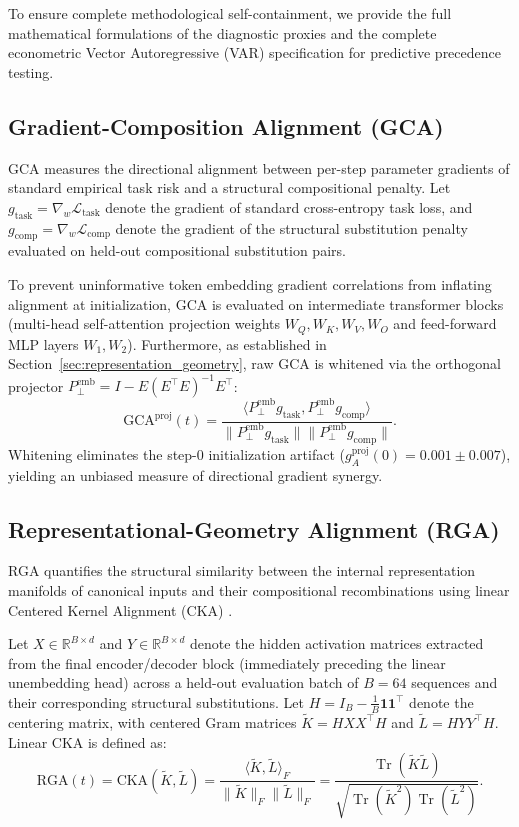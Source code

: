 \documentclass{article}
\theoremstyle{plain}
\theoremstyle{definition}
\DeclareMathOperator{\Tr}{Tr}
\begin{document}
To ensure complete methodological self-containment, we provide the full mathematical formulations of the diagnostic proxies and the complete econometric Vector Autoregressive (VAR) specification for predictive precedence testing.
\subsection{Gradient-Composition Alignment (GCA)}
GCA measures the directional alignment between per-step parameter gradients of standard empirical task risk and a structural compositional penalty. Let $g_{\text{task}} = \nabla_w \mathcal{L}_{\text{task}}$ denote the gradient of standard cross-entropy task loss, and $g_{\text{comp}} = \nabla_w \mathcal{L}_{\text{comp}}$ denote the gradient of the structural substitution penalty evaluated on held-out compositional substitution pairs.

To prevent uninformative token embedding gradient correlations from inflating alignment at initialization, GCA is evaluated on intermediate transformer blocks (multi-head self-attention projection weights $W_Q, W_K, W_V, W_O$ and feed-forward MLP layers $W_1, W_2$). Furthermore, as established in Section~\ref{sec:representation_geometry}, raw GCA is whitened via the orthogonal projector $P_{\perp}^{\text{emb}} = I - E (E^\top E)^{-1} E^\top$:
\begin{equation}
    \text{GCA}^{\text{proj}}(t) = \frac{\langle P_{\perp}^{\text{emb}} g_{\text{task}}, P_{\perp}^{\text{emb}} g_{\text{comp}} \rangle}{\| P_{\perp}^{\text{emb}} g_{\text{task}} \| \| P_{\perp}^{\text{emb}} g_{\text{comp}} \|}.
    \label{eq:app_whitened_gca}
\end{equation}
Whitening eliminates the step-0 initialization artifact ($g_A^{\text{proj}}(0) = 0.001 \pm 0.007$), yielding an unbiased measure of directional gradient synergy.

\subsection{Representational-Geometry Alignment (RGA)}
RGA quantifies the structural similarity between the internal representation manifolds of canonical inputs and their compositional recombinations using linear Centered Kernel Alignment (CKA) \citep{Kornblith2019Similarity}.

Let $X \in \mathbb{R}^{B \times d}$ and $Y \in \mathbb{R}^{B \times d}$ denote the hidden activation matrices extracted from the final encoder/decoder block (immediately preceding the linear unembedding head) across a held-out evaluation batch of $B=64$ sequences and their corresponding structural substitutions. Let $H = I_B - \frac{1}{B}\mathbf{1}\mathbf{1}^\top$ denote the centering matrix, with centered Gram matrices $\tilde{K} = H X X^\top H$ and $\tilde{L} = H Y Y^\top H$. Linear CKA is defined as:
\begin{equation}
    \text{RGA}(t) = \text{CKA}(\tilde{K}, \tilde{L}) = \frac{\langle \tilde{K}, \tilde{L} \rangle_F}{\| \tilde{K} \|_F \| \tilde{L} \|_F} = \frac{\Tr(\tilde{K} \tilde{L})}{\sqrt{\Tr(\tilde{K}^2) \Tr(\tilde{L}^2)}}.
    \label{eq:app_rga}
\end{equation}
\end{document}
